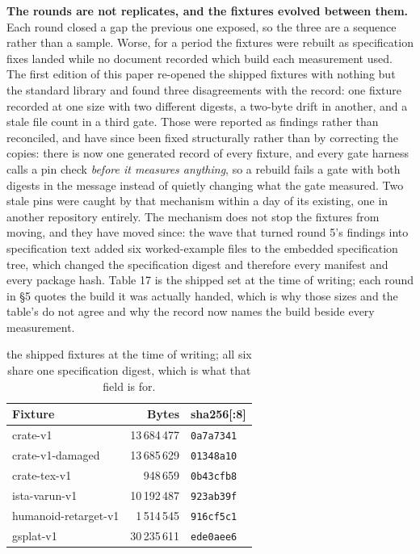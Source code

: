 \documentclass[10pt,twocolumn,letterpaper]{article}
\newcommand{\code}[1]{\texttt{\small #1}}
\begin{document}
\textbf{The rounds are not replicates, and the fixtures evolved between them.} Each round closed a gap the previous one exposed, so the three are a sequence rather than a sample. Worse, for a period the fixtures were rebuilt as specification fixes landed while no document recorded which build each measurement used. The first edition of this paper re-opened the shipped fixtures with nothing but the standard library and found three disagreements with the record: one fixture recorded at one size with two different digests, a two-byte drift in another, and a stale file count in a third gate. Those were reported as findings rather than reconciled, and have since been fixed structurally rather than by correcting the copies: there is now one generated record of every fixture, and every gate harness calls a pin check \emph{before it measures anything}, so a rebuild fails a gate with both digests in the message instead of quietly changing what the gate measured. Two stale pins were caught by that mechanism within a day of its existing, one in another repository entirely. The mechanism does not stop the fixtures from moving, and they have moved since: the wave that turned round 5's findings into specification text added six worked-example files to the embedded specification tree, which changed the specification digest and therefore every manifest and every package hash. Table 17 is the shipped set at the time of writing; each round in \S5 quotes the build it was actually handed, which is why those sizes and the table's do not agree and why the record now names the build beside every measurement.

\begin{table}[t]\centering\footnotesize
\caption{the shipped fixtures at the time of writing; all six share one specification digest, which is what that field is for.}
\begin{tabular}{@{}L{3.5cm} r l@{}}
\toprule
Fixture & Bytes & sha256[:8] \\
\midrule
crate-v1 & 13\,684\,477 & \code{0a7a7341} \\
crate-v1-damaged & 13\,685\,629 & \code{01348a10} \\
crate-tex-v1 & 948\,659 & \code{0b43cfb8} \\
ista-varun-v1 & 10\,192\,487 & \code{923ab39f} \\
humanoid-retarget-v1 & 1\,514\,545 & \code{916cf5c1} \\
gsplat-v1 & 30\,235\,611 & \code{ede0aee6} \\
\bottomrule
\end{tabular}
\end{table}
\end{document}
